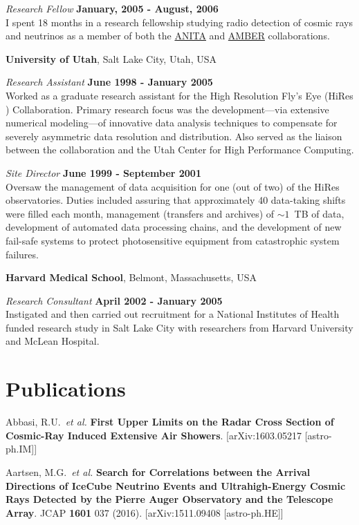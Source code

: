 \begin{resume}
{\em Research Fellow} \hfill {\bf January, 2005 - August, 2006}\\
I spent 18 months in a research fellowship studying radio
    detection of cosmic rays and neutrinos as a member of both the
    \href{http://arxiv.org/abs/astro-ph/0512265}{ANITA} and
    \href{http://arxiv.org/abs/0705.2589}{AMBER} collaborations.


{\bf University of Utah}, Salt Lake City, Utah, USA

\vspace{-.3cm}
{\em Research Assistant} \hfill {\bf June 1998 - January 2005}\\
Worked as a graduate research assistant for the High Resolution Fly's Eye (HiRes
) Collaboration.  Primary research focus was the development---via extensive 
numerical modeling---of innovative data analysis techniques to compensate 
for severely asymmetric data resolution and distribution. Also served as the 
liaison between the collaboration and the Utah Center for High Performance 
Computing.

{\em Site Director} \hfill {\bf June 1999 - September 2001}\\
Oversaw the management of data acquisition for one (out of two) of the HiRes
observatories.  Duties included assuring that approximately 40 data-taking 
shifts were filled each month, management (transfers and archives) of 
$\sim1$~TB of data, development of automated data processing chains,
and the development of new fail-safe systems to protect 
photosensitive equipment from catastrophic system failures.

{\bf Harvard Medical School}, Belmont, Massachusetts, USA

\vspace{-.3cm}
{\em Research Consultant} \hfill {\bf April 2002 - January 2005}\\
Instigated and then carried out recruitment for a National Institutes of Health
funded research study in Salt Lake City with researchers from Harvard 
University and McLean Hospital.
 
\section{\sc Publications}

Abbasi, R.U.\ {\it et al.} {\bf First Upper Limits on the Radar Cross Section of Cosmic-Ray Induced Extensive Air Showers}. [arXiv:1603.05217 [astro-ph.IM]]

Aartsen, M.G.\ {\it et al.} {\bf Search for Correlations between the Arrival Directions of IceCube Neutrino Events and Ultrahigh-Energy Cosmic Rays Detected by the Pierre Auger Observatory and the Telescope Array}. JCAP {\bf 1601} 037 (2016). [arXiv:1511.09408 [astro-ph.HE]]


\end{resume}
